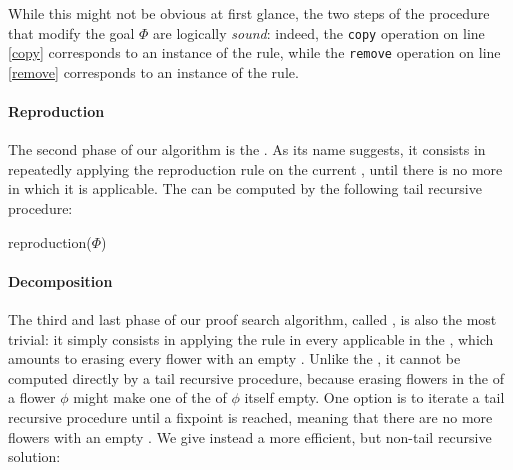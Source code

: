 \begin{scope}
While this might not be obvious at first glance, the two steps of the
 procedure that modify the goal $\Phi$ are logically
\emph{sound}: indeed, the \texttt{copy} operation on line \ref{copy} corresponds
to an instance of the  rule, while the \texttt{remove} operation
on line \ref{remove} corresponds to an instance of the  rule.

\paragraph{Reproduction}

\AP
The second phase of our algorithm is the . As its name
suggests, it consists in repeatedly applying the reproduction rule  on
the current , until there is no more  in which it is
applicable. The  can be computed
by the following tail recursive procedure:

\begin{procedure}[H]
  \caption{reproduction($\Phi$)}
  \BlankLine

\end{procedure}

\paragraph{Decomposition}

\AP
The third and last phase of our proof search algorithm, called
, is also the most trivial: it simply consists in applying
the  rule in every applicable  in the , which amounts to
erasing every flower with an empty . Unlike the , it cannot be
computed directly by a tail recursive procedure, because erasing flowers in the
 of a flower $\phi$ might make one of the  of $\phi$ itself empty.
One option is to iterate a tail recursive procedure until a fixpoint is reached,
meaning that there are no more flowers with an empty . We give instead a
more efficient, but non-tail recursive solution:


\end{scope}
